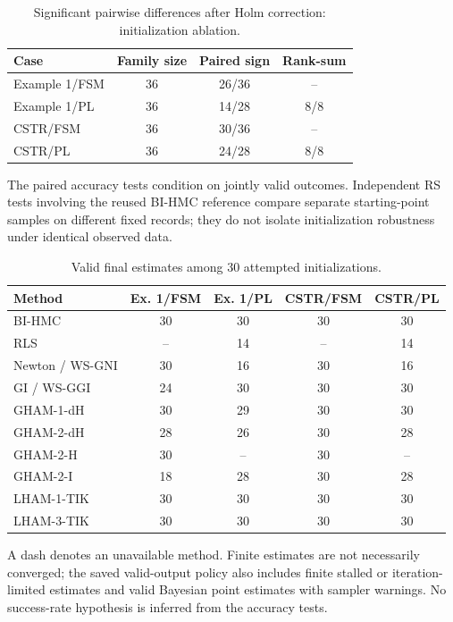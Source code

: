 \begin{table}[!htbp]
\centering
\small
\caption{Significant pairwise differences after Holm correction: initialization ablation.}
\label{tab:expstats_summary_initialization}
\setlength{\tabcolsep}{5pt}
\renewcommand{\arraystretch}{1.12}
\begin{tabular}{@{}lccc@{}}
\toprule
Case & Family size & Paired sign & Rank-sum \\
\midrule
Example 1/FSM & 36 & 26/36 & -- \\
Example 1/PL & 36 & 14/28 & 8/8 \\
CSTR/FSM & 36 & 30/36 & -- \\
CSTR/PL & 36 & 24/28 & 8/8 \\
\bottomrule
\end{tabular}
\par\smallskip
\begin{minipage}{\linewidth}\footnotesize
The paired accuracy tests condition on jointly valid outcomes. Independent RS tests involving the reused BI-HMC reference compare separate starting-point samples on different fixed records; they do not isolate initialization robustness under identical observed data.
\end{minipage}
\end{table}
\begin{table}[!htbp]
\centering
\small
\caption{Valid final estimates among 30 attempted initializations.}
\label{tab:expstats_initialization_valid}
\setlength{\tabcolsep}{5pt}
\renewcommand{\arraystretch}{1.12}
\begin{tabular}{@{}lcccc@{}}
\toprule
Method & Ex. 1/FSM & Ex. 1/PL & CSTR/FSM & CSTR/PL \\
\midrule
BI-HMC & 30 & 30 & 30 & 30 \\
RLS & -- & 14 & -- & 14 \\
Newton / WS-GNI & 30 & 16 & 30 & 16 \\
GI / WS-GGI & 24 & 30 & 30 & 30 \\
GHAM-1-dH & 30 & 29 & 30 & 30 \\
GHAM-2-dH & 28 & 26 & 30 & 28 \\
GHAM-2-H & 30 & -- & 30 & -- \\
GHAM-2-I & 18 & 28 & 30 & 28 \\
LHAM-1-TIK & 30 & 30 & 30 & 30 \\
LHAM-3-TIK & 30 & 30 & 30 & 30 \\
\bottomrule
\end{tabular}
\par\smallskip
\begin{minipage}{\linewidth}\footnotesize
A dash denotes an unavailable method. Finite estimates are not necessarily converged; the saved valid-output policy also includes finite stalled or iteration-limited estimates and valid Bayesian point estimates with sampler warnings. No success-rate hypothesis is inferred from the accuracy tests.
\end{minipage}
\end{table}
